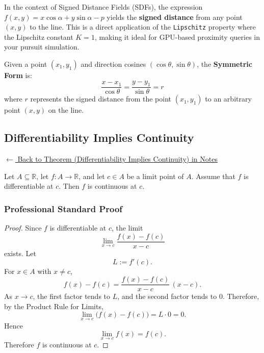 \begin{remark}
In the context of Signed Distance Fields (SDFs), the expression $f(x,y) = x \cos \alpha + y \sin \alpha - p$ yields the \textbf{signed distance} from any point $(x,y)$ to the line. This is a direct application of the \texttt{Lipschitz} property where the Lipschitz constant $K=1$, making it ideal for GPU-based proximity queries in your pursuit simulation.
\end{remark}

\begin{definition}
Given a point $(x_1, y_1)$ and direction cosines $(\cos \theta, \sin \theta)$, the \textbf{Symmetric Form} is:
\[ \frac{x - x_1}{\cos \theta} = \frac{y - y_1}{\sin \theta} = r \]
where $r$ represents the signed distance from the point $(x_1, y_1)$ to an arbitrary point $(x, y)$ on the line.
\end{definition}



\clearpage
\subsection*{Differentiability Implies Continuity}
\label{prf:differentiability-implies-continuity}

\begin{remark*}[Return]
\hyperref[thm:differentiability-implies-continuity]{$\leftarrow$ Back to Theorem (Differentiability Implies Continuity) in Notes}
\end{remark*}

\begin{remark*}[Claim]
Let $A \subseteq \mathbb{R}$, let $f : A \to \mathbb{R}$, and let $c \in A$ be a limit point of $A$.
Assume that $f$ is differentiable at $c$. Then $f$ is continuous at $c$.
\end{remark*}

\subsubsection*{Professional Standard Proof}

\begin{proof}
Since $f$ is differentiable at $c$, the limit
\[
\lim_{x \to c} \frac{f(x)-f(c)}{x-c}
\]
exists. Let
\[
L:=f'(c).
\]
For $x \in A$ with $x \neq c$,
\[
f(x)-f(c)=\frac{f(x)-f(c)}{x-c}\,(x-c).
\]
As $x \to c$, the first factor tends to $L$, and the second factor tends to $0$. Therefore, by the Product Rule for Limits,
\[
\lim_{x \to c} \bigl(f(x)-f(c)\bigr)=L\cdot 0=0.
\]
Hence
\[
\lim_{x \to c} f(x)=f(c).
\]
Therefore $f$ is continuous at $c$.
\end{proof}


